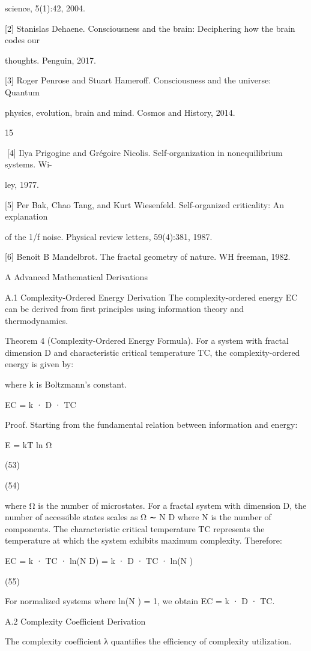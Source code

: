 science, 5(1):42, 2004.

[2] Stanislas Dehaene. Consciousness and the brain: Deciphering how the brain codes our

thoughts. Penguin, 2017.

[3] Roger Penrose and Stuart Hameroff. Consciousness and the universe: Quantum

physics, evolution, brain and mind. Cosmos and History, 2014.

15

[4] Ilya Prigogine and Grégoire Nicolis. Self-organization in nonequilibrium systems. Wi-

ley, 1977.

[5] Per Bak, Chao Tang, and Kurt Wiesenfeld. Self-organized criticality: An explanation

of the 1/f noise. Physical review letters, 59(4):381, 1987.

[6] Benoit B Mandelbrot. The fractal geometry of nature. WH freeman, 1982.

A Advanced Mathematical Derivations

A.1 Complexity-Ordered Energy Derivation
The complexity-ordered energy EC can be derived from first principles using information
theory and thermodynamics.

Theorem 4 (Complexity-Ordered Energy Formula). For a system with fractal dimension
D and characteristic critical temperature TC, the complexity-ordered energy is given by:

where k is Boltzmann’s constant.

EC = k · D · TC

Proof. Starting from the fundamental relation between information and energy:

E = kT ln Ω

(53)

(54)

where Ω is the number of microstates. For a fractal system with dimension D, the
number of accessible states scales as Ω ∼ N D where N is the number of components.
The characteristic critical temperature TC represents the temperature at which the system
exhibits maximum complexity. Therefore:

EC = k · TC · ln(N D) = k · D · TC · ln(N )

(55)

For normalized systems where ln(N ) = 1, we obtain EC = k · D · TC.

A.2 Complexity Coefficient Derivation

The complexity coefficient λ quantifies the efficiency of complexity utilization.


